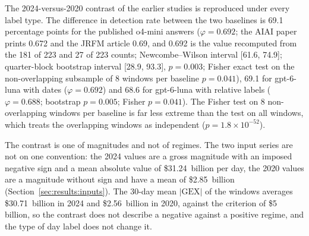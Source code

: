The 2024-versus-2020 contrast of the earlier studies is reproduced under every label type. The difference in detection rate between the two baselines is 69.1 percentage points for the published o4-mini answers ($\varphi=0.692$; the AIAI paper prints 0.672 and the JRFM article 0.69, and 0.692 is the value recomputed from the 181 of 223 and 27 of 223 counts; Newcombe--Wilson interval [61.6, 74.9]; quarter-block bootstrap interval [28.9, 93.3], $p=0.003$; Fisher exact test on the non-overlapping subsample of 8 windows per baseline $p=0.041$), 69.1 for gpt-6-luna with dates ($\varphi=0.692$) and 68.6 for gpt-6-luna with relative labels ($\varphi=0.688$; bootstrap $p=0.005$; Fisher $p=0.041$). The Fisher test on 8 non-overlapping windows per baseline is far less extreme than the test on all windows, which treats the overlapping windows as independent ($p=1.8\times10^{-52}$).

The contrast is one of magnitudes and not of regimes. The two input series are not on one convention: the 2024 values are a gross magnitude with an imposed negative sign and a mean absolute value of \$31.24~billion per day, the 2020 values are a magnitude without sign and have a mean of \$2.85~billion (Section~\ref{sec:results:inputs}). The 30-day mean $|\mathrm{GEX}|$ of the windows averages \$30.71~billion in 2024 and \$2.56~billion in 2020, against the criterion of \$5 billion, so the contrast does not describe a negative against a positive regime, and the type of day label does not change it.

